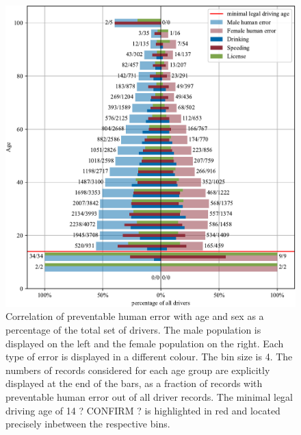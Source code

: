 \documentclass{article}
\theoremstyle{plain}
\theoremstyle{definition}
\theoremstyle{remark}
\begin{document}
\begin{figure}[ht]
	\vskip 0.2in
	\begin{center}
		\centerline{\includegraphics[width=\columnwidth]{plots/err-demography}}
		\caption{Correlation of preventable human error with age and sex as a percentage of the total set of drivers. The male population is displayed on the left and the female population on the right. Each type of error is displayed in a different colour. The bin size is 4. The numbers of records considered for each age group are explicitly displayed at the end of the bars, as a fraction of records with preventable human error out of all driver records. The minimal legal driving age of 14 ? CONFIRM ? is highlighted in red and located precisely inbetween the respective bins.}
		\label{fig:err-demography}
	\end{center}
	\vskip -0.2in
\end{figure}
\end{document}
